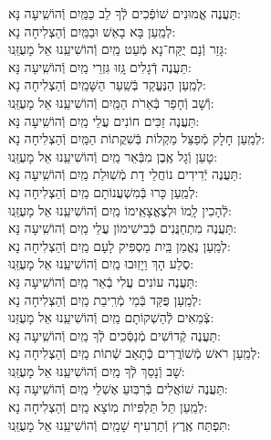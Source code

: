 \documentclass[twoside, openany, parskip=half, 11pt]{book}
\begin{document}
\begin{small}
	תַּעֲנֶה אֱמוּנִים שׁוֹפְֿכִים לְֿךָ לֵב כַּמַּֽיִם \hfill וְֿהוֹשִֽׁיעָה נָּא:\\
	לְמַֽעַן בָּא בָאֵשׁ וּבַמַּֽיִם \hfill וְֿהַצְלִיחָה נָא: \\
	גָּזַר וְֿנָם יֻקַּח־נָא מְֿעַט מַֽיִם \hfill וְֿהוֹשִׁיעֵֽנוּ אֵל מָעֻזֵּֽנוּ:\\
	תַּעֲנֶה דְֿגָלִים גָּֽזוּ גִּזְרֵי מַֽיִם \hfill וְֿהוֹשִֽׁיעָה נָּא:\\
	לְמַֽעַן הַנֶּעֱקַד בְּֿשַֽׁעַר הַשָּׁמַֽיִם \hfill וְֿהַצְלִיחָה נָא:\\
	וְֿשָׁב וְֿחָפַר בְּֿאֵרֹת הַמַּֽיִם \hfill וְֿהוֹשִׁיעֵֽנוּ אֵל מָעֻזֵּֽנוּ:\\
	תַּעֲנֶה זַכִּים חוֹנִים עֲלֵי מַֽיִם \hfill וְֿהוֹשִֽׁיעָה נָּא:\\
	לְמַֽעַן חָלָק מְֿפַצֵּל מַקְלוֹת בְּֿשִׁקֲתוֹת הַמַּֽיִם \hfill וְֿהַצְלִיחָה נָא:\\
	טָעַן וְֿגָל אֶֽבֶן מִבְּֿאֵר מַֽיִם \hfill וְֿהוֹשִׁיעֵֽנוּ אֵל מָעֻזֵּֽנוּ:\\
	תַּעֲנֶה יְֿדִידִים נוֹחֲלֵי דָת מְֿשֽׁוּלַת מַֽיִם \hfill וְֿהוֹשִֽׁיעָה נָּא: \\
	לְמַֽעַן כָּרוּ בְּֿמִשְׁעֲנוֹתָם מַֽיִם \hfill וְֿהַצְלִיחָה נָא:\\
	לְֿהָכִין לָֽמוֹ וּלְצֶאֱצָאֵֽימוֹ מַֽיִם \hfill וְֿהוֹשִׁיעֵֽנוּ אֵל מָעֻזֵּֽנוּ:\\
	תַּעֲנֶה מִתְחַנֲּנִים כְּֿבִישִׁימוֹן עֲלֵי מַֽיִם \hfill וְֿהוֹשִֽׁיעָה נָּא:\\
	לְמַֽעַן נֶאֱמַן בַּֽיִת מַסְפִּיק לָעָם מַֽיִם \hfill וְֿהַצְלִיחָה נָא:\\
	סֶלַע הָךְ וַיָזֽוּבוּ מַֽיִם \hfill וְֿהוֹשִׁיעֵֽנוּ אֵל מָעֻזֵּֽנוּ: \\
	תַּעֲנֶה עוֹנִים עֲלִי בְֿאֵר מַֽיִם \hfill וְֿהוֹשִֽׁיעָה נָּא: \\
	לְמַֽעַן פֻּקַּד בְּֿמֵי מְֿרִֽיבַת מַֽיִם \hfill וְֿהַצְלִיחָה נָא:\\
	צְֿמֵאִים לְֿהַשְׁקוֹתָם מַֽיִם \hfill וְֿהוֹשִׁיעֵֽנוּ אֵל מָעֻזֵּנוּ: \\
	תַּעֲנֶה קְֿדוֹשִׁים מְֿנַסְּֿכִים לְֿךָ מַֽיִם \hfill וְֿהוֹשִֽׁיעָה נָּא: \\
	לְמַֽעַן רֹאשׁ מְֿשׁוֹרֲרִים כְּֿתָאַב שְֿׁתוֹת מַֽיִם \hfill וְֿהַצְלִיחָה נָא:\\
	שָׁב וְֿנָסַךְ לְֿךָ מַֽיִם \hfill וְֿהוֹשִׁיעֵֽנוּ אֵל מָעֻזֵּֽנוּ:\\
	תַּעֲנֶה שׁוֹאֲלִים בְּֿרִבּֽוּעַ אֶשְׁלֵי מַֽיִם \hfill וְֿהוֹשִֽׁיעָה נָּא: \\
	לְמַֽעַן תֵּל תַּלְפִּיוֹת מֽוֹצָא מַֽיִם \hfill וְֿהַצְלִיחָה נָא:\\
	תִּפְתַּח אֶֽרֶץ וְֿתַרְעִיף שָׁמַֽיִם \hfill וְֿהוֹשִׁיעֵֽנוּ אֵל מָעֻזֵּֽנוּ:
	
\end{small}
\end{document}
